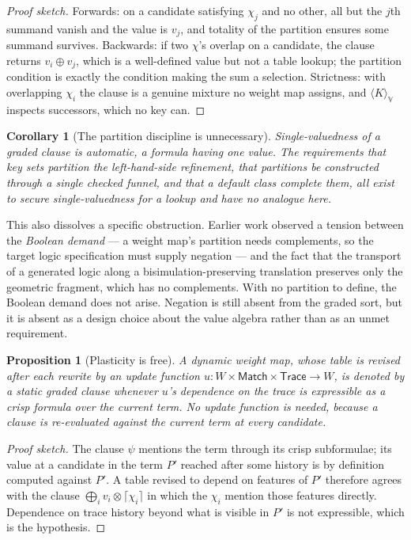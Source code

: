 \documentclass[11pt,a4paper]{article}
\theoremstyle{plain}
\newtheorem{proposition}[theorem]{Proposition}
\newtheorem{corollary}[theorem]{Corollary}
\theoremstyle{definition}
\theoremstyle{remark}
\newcommand{\V}{\mathbb{V}}
\newcommand{\tensorv}{\otimes}
\newcommand{\sumv}{\oplus}
\newcommand{\crisp}[1]{\lceil #1 \rceil}
\begin{document}
\begin{proof}[Proof sketch]
Forwards: on a candidate satisfying $\chi_j$ and no other, all but the $j$th
summand vanish and the value is $v_j$, and totality of the partition ensures some
summand survives. Backwards: if two $\chi$'s overlap on a candidate, the clause
returns $v_i \sumv v_j$, which is a well-defined value but not a table lookup;
the partition condition is exactly the condition making the sum a selection.
Strictness: with overlapping $\chi_i$ the clause is a genuine mixture no weight
map assigns, and $\langle K\rangle_\V$ inspects successors, which no key can.
\end{proof}

\begin{corollary}[The partition discipline is unnecessary]\label{cor:nopartition}
Single-valuedness of a graded clause is automatic, a formula having one value.
The requirements that key sets partition the left-hand-side refinement, that
partitions be constructed through a single checked funnel, and that a default
class complete them, all exist to secure single-valuedness for a lookup and have
no analogue here.
\end{corollary}

This also dissolves a specific obstruction. Earlier work observed a tension
between the \emph{Boolean demand} --- a weight map's partition needs complements,
so the target logic specification must supply negation --- and the fact that the
transport of a generated logic along a bisimulation-preserving translation
preserves only the geometric fragment, which has no complements. With no
partition to define, the Boolean demand does not arise. Negation is still absent
from the graded sort, but it is absent as a design choice about the value algebra
rather than as an unmet requirement.

\begin{proposition}[Plasticity is free]\label{prop:plastic}
A dynamic weight map, whose table is revised after each rewrite by an update
function $u : W \times \textsf{Match} \times \textsf{Trace} \to W$, is denoted by
a static graded clause whenever $u$'s dependence on the trace is expressible as a
crisp formula over the current term. No update function is needed, because a
clause is re-evaluated against the current term at every candidate.
\end{proposition}

\begin{proof}[Proof sketch]
The clause $\psi$ mentions the term through its crisp subformulae; its value at
a candidate in the term $P'$ reached after some history is by definition computed
against $P'$. A table revised to depend on features of $P'$ therefore agrees with
the clause $\bigoplus_i v_i \tensorv \crisp{\chi_i}$ in which the $\chi_i$
mention those features directly. Dependence on trace history beyond what is
visible in $P'$ is not expressible, which is the hypothesis.
\end{proof}
\end{document}
